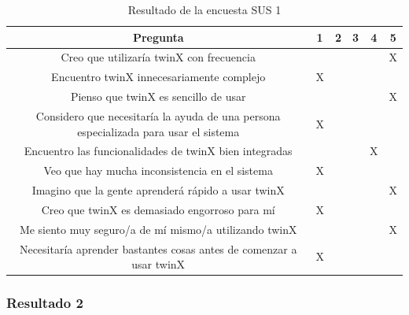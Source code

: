 \begin{table}[H]
	\begin{center}
		\begin{adjustbox}{width=\textwidth}
			\begin{tabular}{ | c | c | c | c | c | c | } 
				\hline
				\textbf{Pregunta} & 1 & 2 & 3 & 4 & 5 \\
				\hline
				Creo que utilizaría twinX con frecuencia &  &  &  &  & X \\
				\hline
				Encuentro twinX innecesariamente complejo &  X &  &  &  &  \\
				\hline
				Pienso que twinX es sencillo de usar &  &  &  &  & X \\
				\hline
				Considero que necesitaría la ayuda de una persona especializada para usar el sistema & X &  &  &  &  \\
				\hline
				Encuentro las funcionalidades de twinX bien integradas &  &  &  & X &  \\
				\hline
				Veo que hay mucha inconsistencia en el sistema & X &  &  &  &  \\
				\hline
				Imagino que la gente aprenderá rápido a usar twinX &  &  &  &  & X \\
				\hline
				Creo que twinX es demasiado engorroso para mí & X &  &  &  &  \\
				\hline
				Me siento muy seguro/a de mí mismo/a utilizando twinX &  &  &  &  & X \\
				\hline
				Necesitaría aprender bastantes cosas antes de comenzar a usar twinX & X &  &  &  &  \\
				\hline
			\end{tabular}
		\end{adjustbox}
		\caption{Resultado de la encuesta SUS 1}
		\label{tab:sus1}
	\end{center}
\end{table}

\subsubsection*{Resultado 2}

